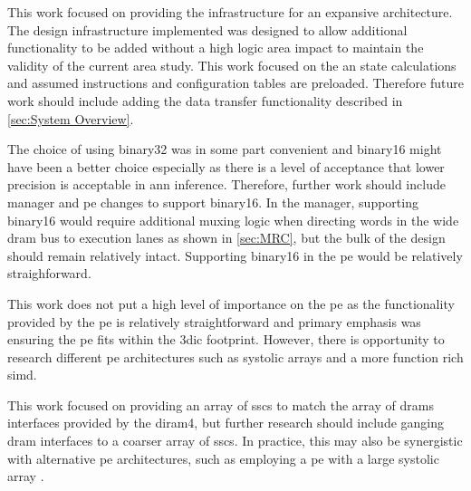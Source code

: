 This work focused on providing the infrastructure for an expansive architecture.
The design infrastructure implemented was designed to allow additional functionality to be added without a high logic area impact to maintain the validity of the current area study.
This work focused on the \ac{an} state calculations and assumed instructions and configuration tables are preloaded.
Therefore future work should include adding the data transfer functionality described in \ref{sec:System Overview}.

The choice of using \ac{binary32} was in some part convenient and \ac{binary16} might have been a better choice especially as there is a level of acceptance that lower precision is acceptable in \ac{ann} inference.
Therefore, further work should include manager and \ac{pe} changes to support \ac{binary16}.
In the manager, supporting \ac{binary16} would require additional muxing logic when directing words in the wide \ac{dram} bus to execution lanes as shown in \ref{sec:MRC}, but the bulk of the design should remain relatively intact.
Supporting \ac{binary16} in the \ac{pe} would be relatively straighforward.

This work does not put a high level of importance on the \ac{pe} as the functionality provided by the \ac{pe} is relatively straightforward and primary emphasis was ensuring the \ac{pe} fits within the \ac{3dic} footprint.
However, there is opportunity to research different \ac{pe} architectures such as systolic arrays and a more function rich \ac{simd}.

This work focused on providing an array of \acp{ssc} to match the array of \acp{dram} interfaces provided by the \ac{diram4}, but further research should include ganging \ac{dram} interfaces to a coarser array of \acp{ssc}.
In practice, this may also be synergistic with alternative \ac{pe} architectures, such as employing a \ac{pe} with a large systolic array \cite{tensorflow2015-whitepaper}.

\iffalse
  \item Half-Precision PE
  \item Additional PE pipelining
  \item Systolic PE
\fi


